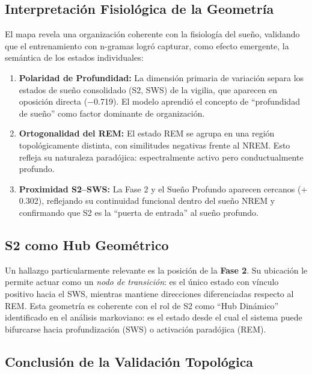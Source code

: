 \subsection{Interpretación Fisiológica de la Geometría}

El mapa revela una organización coherente con la fisiología del sueño, validando que el entrenamiento con n-gramas logró capturar, como efecto emergente, la semántica de los estados individuales:

\begin{enumerate}
    \item \textbf{Polaridad de Profundidad:} La dimensión primaria de variación separa los estados de sueño consolidado (S2, SWS) de la vigilia, que aparecen en oposición directa ($-$0.719). El modelo aprendió el concepto de ``profundidad de sueño'' como factor dominante de organización.

    \item \textbf{Ortogonalidad del REM:} El estado REM se agrupa en una región topológicamente distinta, con similitudes negativas frente al NREM. Esto refleja su naturaleza paradójica: espectralmente activo pero conductualmente profundo.

    \item \textbf{Proximidad S2--SWS:} La Fase 2 y el Sueño Profundo aparecen cercanos ($+$0.302), reflejando su continuidad funcional dentro del sueño NREM y confirmando que S2 es la ``puerta de entrada'' al sueño profundo.
\end{enumerate}

\subsection{S2 como Hub Geométrico}

Un hallazgo particularmente relevante es la posición de la \textbf{Fase 2}. Su ubicación le permite actuar como un \textit{nodo de transición}: es el único estado con vínculo positivo hacia el SWS, mientras mantiene direcciones diferenciadas respecto al REM. Esta geometría es coherente con el rol de S2 como ``Hub Dinámico'' identificado en el análisis markoviano: es el estado desde el cual el sistema puede bifurcarse hacia profundización (SWS) o activación paradójica (REM).

\subsection{Conclusión de la Validación Topológica}

